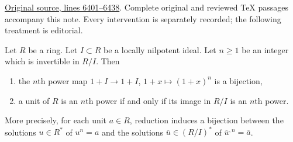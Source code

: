 \noindent\href{https://github.com/stacks/stacks-project/blob/a04446e57ec1fbc252a871afcec7752fb2807b14/algebra.tex\#L6401}{Original source, lines 6401--6438}. Complete original and reviewed TeX passages accompany this note. Every intervention is separately recorded; the following treatment is editorial.


\begin{lemma}
\label{editorial-source-lemma-lift-nth-roots}
Let $R$ be a ring. Let $I \subset R$ be a locally nilpotent ideal.
Let $n \geq 1$ be an integer which is invertible in $R/I$. Then
\begin{enumerate}
\item the $n$th power map $1 + I \to 1 + I$, $1 + x \mapsto (1 + x)^n$
is a bijection,
\item a unit of $R$ is an $n$th power if and only if its image in $R/I$
is an $n$th power.
\end{enumerate}
More precisely, for each unit $a\in R$, reduction induces a bijection
between the solutions $u\in R^*$ of $u^n=a$ and the solutions
$\overline u\in(R/I)^*$ of $\overline u^{,n}=\overline a$.
\end{lemma}


